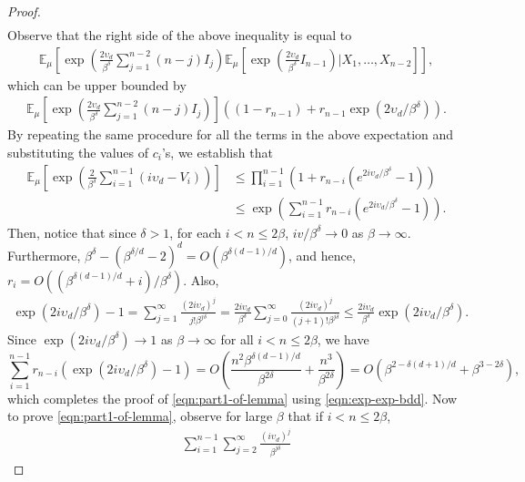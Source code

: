 \documentclass[pdflatex, sn-mathphys-ay]{sn-jnl}%
\newcommand{\ee}{\mathbb{E}}
\newcommand{\lt}{\left}
\newcommand{\rt}{\right}
\theoremstyle{thmstyleone}%
\theoremstyle{thmstyletwo}%
\theoremstyle{thmstylethree}%
\begin{document}
\begin{appendices}
\begin{proof}
\begin{align*}
\end{align*}
Observe that the right side of the above inequality is equal to 
\begin{align*}
{  \ee_\mu\lt[\exp\lt(\frac{2 \upsilon_d}{\beta^{\delta}} \sum_{j = 1}^{n-2} (n - j) I_j \rt) \ee_\mu\lt[ \exp\lt(\frac{2 \upsilon_d}{\beta^{\delta}} I_{n-1} \rt)\big| X_1,\dots, X_{n-2}\rt]\rt]},
\end{align*}
which can be upper bounded by
\begin{align*}
\ee_\mu\lt[\exp\lt(\frac{2 \upsilon_d}{\beta^{\delta}} \sum_{j = 1}^{n-2} (n - j) I_j \rt) \rt] \lt((1 - r_{n-1}) + r_{n-1} \exp(2 \upsilon_d/\beta^{\delta}) \rt).
\end{align*}
By repeating the same procedure for all the terms in the above expectation and substituting the values of $c_i$'s, we establish that 
\begin{align}
\ee_\mu\lt[\exp\lt(\frac{2}{\beta^{\delta}}  \sum_{i =1}^{n-1} (i\upsilon_d - V_i)\rt)\rt] 
&\leq \prod_{i = 1}^{n-1}\lt(1 + r_{n-i} (e^{2i \upsilon_d/\beta^{\delta}} -1) \rt)\nonumber\\
&\leq \exp\lt( \sum_{i = 1}^{n-1} r_{n-i} (e^{2i \upsilon_d/\beta^{\delta}} -1) \rt). 
\label{eqn:exp-exp-bdd}
\end{align}
Then, notice that since $\delta > 1$, for each $i < n \leq 2\beta$, $iv/\beta^{\delta} \to 0$ as $\beta \to \infty$. Furthermore, 
 $\beta^{\delta} - (\beta^{\delta/d} - 2)^d = O(\beta^{\delta(d -1)/d})$, and hence,  
$r_i = O\lt((\beta^{\delta(d-1)/d} + i)/\beta^{\delta}\rt)$.
Also,
\begin{align*}
    \exp(2i \upsilon_d/\beta^{\delta}) -1 = \sum_{j=1}^\infty \frac{(2i \upsilon_d)^j}{j!\beta^{j\delta}} = \frac{2i\upsilon_d}{\beta^{\delta}} \sum_{j=0}^\infty \frac{(2i \upsilon_d)^j}{(j+1)!\beta^{j\delta}} \leq \frac{2i\upsilon_d}{\beta^{\delta}} \exp(2i \upsilon_d/\beta^{\delta}).
\end{align*}
Since $\exp(2i \upsilon_d/\beta^{\delta}) \to 1$ as $\beta \to \infty$ for all $i < n \leq 2\beta$, we have
\[
\sum_{i = 1}^{n-1} r_{n-i} (\exp(2i \upsilon_d/\beta^{\delta}) -1) = O\lt(\frac{n^2\beta^{\delta(d-1)/d}}{\beta^{2\delta}} + \frac{n^3}{\beta^{2\delta}} \rt) = O\lt(\beta^{2 - {\delta(d+1)/d}} + \beta^{3 - 2\delta} \rt),
\]
which completes the proof of \eqref{eqn:part1-of-lemma} using \eqref{eqn:exp-exp-bdd}.
Now to prove \eqref{eqn:part1-of-lemma}, observe for large $\beta$ that if $i < n \leq 2\beta$, 
\begin{align*}
    \sum_{i = 1}^{n -1} \sum_{j = 2}^\infty \frac{(i\upsilon_d)^j}{\beta^{j\delta}} 

\end{align*}
\end{proof}
\end{appendices}
\end{document}
